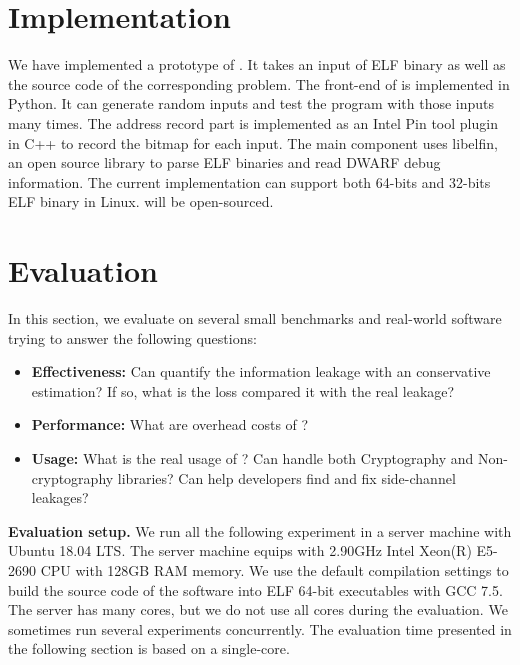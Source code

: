 \section{Implementation}
We have implemented a prototype of \ctool{}. It takes an input of ELF binary as well as the source code of the corresponding problem. The front-end of \ctool{} is implemented in Python. It can generate random inputs and test the program with those inputs many times.  The address record part is implemented as an Intel Pin tool plugin in C++ to record the bitmap for each input. The main component uses libelfin, an open source library to parse ELF binaries and read DWARF debug information. The current implementation can support both 64-bits and 32-bits ELF binary in Linux. \ctool{} will be open-sourced.

\section{Evaluation}
In this section, we evaluate \ctool{} on several small benchmarks and real-world software trying to answer the following questions:

\begin{itemize}
\item \textbf{Effectiveness:} Can \ctool{} quantify the information leakage with an conservative estimation? If so, what is the loss compared it with the real leakage?
\item \textbf{Performance:} What are overhead costs of \ctool{}?
\item \textbf{Usage:} What is the real usage of \ctool{}? Can \ctool{} handle both Cryptography and Non-cryptography libraries? Can \ctool{} help developers find and fix side-channel leakages?
\end{itemize}

\textbf{Evaluation setup.} We run all the following experiment in a server machine with Ubuntu 18.04 LTS. The server machine equips with 2.90GHz Intel Xeon(R) E5-2690 CPU with 128GB RAM memory. We use the default compilation settings to build the source code of the software into ELF 64-bit executables with GCC 7.5. The server has many cores, but we do not use all cores during the evaluation. We sometimes run several experiments concurrently. The evaluation time presented in the following section is based on a single-core.

